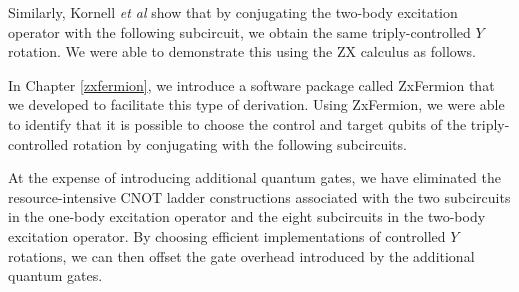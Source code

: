 Similarly, Kornell \textit{et al} \cite{Kornell2023} show that by conjugating the two-body excitation operator with the following subcircuit, we obtain the same triply-controlled $Y$ rotation. We were able to demonstrate this using the ZX calculus as follows.


In Chapter \ref{zxfermion}, we introduce a software package called ZxFermion that we developed to facilitate this type of derivation. Using ZxFermion, we were able to identify that it is possible to choose the control and target qubits of the triply-controlled rotation by conjugating with the following subcircuits.





At the expense of introducing additional quantum gates, we have eliminated the resource-intensive CNOT ladder constructions associated with the two subcircuits in the one-body excitation operator and the eight subcircuits in the two-body excitation operator. By choosing efficient implementations of controlled $Y$ rotations, we can then offset the gate overhead introduced by the additional quantum gates.

